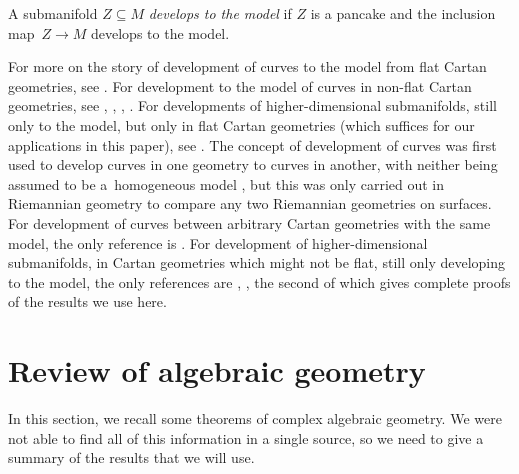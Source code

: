 \documentclass[10pt,a4paper]{amsart}
\numberwithin{equation}{section}
\begin{document}
A submanifold $Z\subseteq M$ \emph{develops to the model} if $Z$ is a pancake and the inclusion map~${Z\!\to\! M}$ develops to the model.

For more on the story of development of curves to the model from flat Cartan geometries, see \cite[p.~3]{Goldman:2010}. For development to the model of curves in non-flat Cartan geometries, see
\cite[p.~108, 1.5.17]{Cap/Slovak:2009}, \cite[p.~54, 41X]{Cartan1935}, \cite{Ehresmann:1951}, \cite[p.~368]{Sharpe:1997}. For developments of higher-dimensional submanifolds, still only to the model, but only
in flat Cartan geometries (which suffices for our applications in this paper), see
\cite[Section~4]{KobayashiOchiai:1980}. The concept of development of curves was first used to develop
curves in one geometry to curves in another, with neither being assumed to be a~homogeneous model
\cite{Rinow1932}, but this was only carried out in Riemannian geometry to compare any two Riemannian
geometries on surfaces. For development of curves between arbitrary Cartan geometries with the same model,
the only reference is \cite[Section~17]{mckay2023introduction}. For development of higher-dimensional
submanifolds, in Cartan geometries which might not be flat, still only developing to the model, the only
references are \cite[Section~2.3]{Biswas.McKay:2016}, \cite[p.~43]{mckay2023introduction}, the second of
which gives complete proofs of the results we use here.

\section{Review of algebraic geometry}\label{section:algebraic.geometry}
In this section, we recall some theorems of complex algebraic geometry.
We were not able to find all of this information in a single source, so we need to give a summary of the results that we will use.
\end{document}
